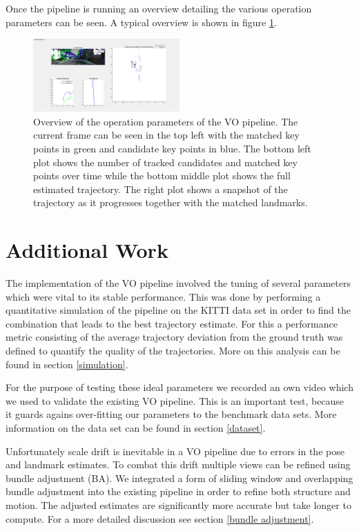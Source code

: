 Once the pipeline is running an overview detailing the various operation parameters can be seen. A typical overview is shown in figure \ref{fig:overview}. 

\begin{figure}[H]
  \centering
    \includegraphics[width=0.5\textwidth]{figures/overview}
  \caption{Overview of the operation parameters of the VO pipeline. The current frame can be seen in the top left with the matched key points in green and candidate key points in blue. The bottom left plot shows the number of tracked candidates and matched key points over time while the bottom middle plot shows the full estimated trajectory. The right plot shows a snapshot of the trajectory as it progresses together with the matched landmarks.}
  \label{fig:overview}
\end{figure}

\section{Additional Work}
The implementation of the VO pipeline involved the tuning of several parameters which were vital to its stable performance. This was done by performing a quantitative simulation of the pipeline on the KITTI data set in order to find the combination that leads to the best trajectory estimate. For this a performance metric consisting of the average trajectory deviation from the ground truth was defined to quantify the quality of the trajectories. More on this analysis can be found in section \ref{simulation}. \par
For the purpose of testing these ideal parameters we recorded an own video which we used to validate the existing VO pipeline. This is an important test, because it guards agains over-fitting our parameters to the benchmark data sets. More information on the data set can be found in section \ref{dataset}. \par
Unfortunately scale drift is inevitable in a VO pipeline due to errors in the pose and landmark estimates. To combat this drift multiple views can be refined using bundle adjustment (BA). We integrated a form of sliding window and overlapping bundle adjustment into the existing pipeline in order to refine both structure and motion. The adjusted estimates are significantly more accurate but take longer to compute. For a more detailed discussion see section \ref{bundle adjustment}.

